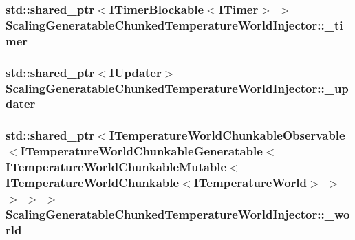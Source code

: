 \hypertarget{class_scaling_generatable_chunked_temperature_world_injector_a4b12d32e1931d08dd426bd28165d8194}{
\subsubsection[{\-\_\-timer}]{\setlength{\rightskip}{0pt plus 5cm}std\-::shared\-\_\-ptr$<${\bf I\-Timer\-Blockable}$<${\bf I\-Timer}$>$ $>$ Scaling\-Generatable\-Chunked\-Temperature\-World\-Injector\-::\-\_\-timer\hspace{0.3cm}{\ttfamily [protected]}}}\label{class_scaling_generatable_chunked_temperature_world_injector_a4b12d32e1931d08dd426bd28165d8194}
\hypertarget{class_scaling_generatable_chunked_temperature_world_injector_aa94745f5caba594ed9dcfbfc21685358}{
\subsubsection[{\-\_\-updater}]{\setlength{\rightskip}{0pt plus 5cm}std\-::shared\-\_\-ptr$<${\bf I\-Updater}$>$ Scaling\-Generatable\-Chunked\-Temperature\-World\-Injector\-::\-\_\-updater\hspace{0.3cm}{\ttfamily [protected]}}}\label{class_scaling_generatable_chunked_temperature_world_injector_aa94745f5caba594ed9dcfbfc21685358}
\hypertarget{class_scaling_generatable_chunked_temperature_world_injector_a8af169452d94765c5bdd6302f5420ebb}{
\subsubsection[{\-\_\-world}]{\setlength{\rightskip}{0pt plus 5cm}std\-::shared\-\_\-ptr$<${\bf I\-Temperature\-World\-Chunkable\-Observable}$<${\bf I\-Temperature\-World\-Chunkable\-Generatable}$<${\bf I\-Temperature\-World\-Chunkable\-Mutable}$<${\bf I\-Temperature\-World\-Chunkable}$<${\bf I\-Temperature\-World}$>$ $>$ $>$ $>$ $>$ Scaling\-Generatable\-Chunked\-Temperature\-World\-Injector\-::\-\_\-world\hspace{0.3cm}{\ttfamily [protected]}}}\label{class_scaling_generatable_chunked_temperature_world_injector_a8af169452d94765c5bdd6302f5420ebb}



